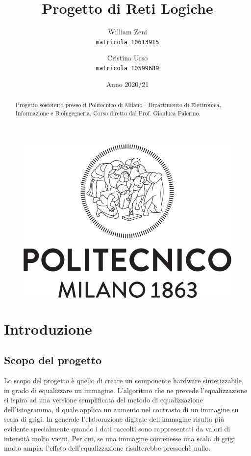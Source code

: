 \documentclass[11pt, a4paper]{article}
\title{Progetto di Reti Logiche}
\author{
  William Zeni\\
  \texttt{matricola 10613915}
  \and
  Cristina Urso\\
  \texttt{matricola 10599689}
}
\date{Anno 2020/21}
\begin{document}
\begin{figure}[t]
  \centering
  \vspace{3cm}
  \includegraphics[scale=0.4]{Logo_Politecnico_Milano.png}
  \vspace{3cm}
\end{figure}

\maketitle
\renewcommand{\abstractname}{ }
\begin{abstract}
  \centering
  Progetto sostenuto presso il Politecnico di Milano - Dipartimento di Elettronica, Informazione e Bioingegneria. Corso diretto dal Prof. Gianluca Palermo.
\end{abstract}

\thispagestyle{empty}
\pagebreak
\tableofcontents
\thispagestyle{empty}
\pagebreak
{}


\section{Introduzione}
\subsection{Scopo del progetto}
Lo scopo del progetto è quello di creare un componente hardware sintetizzabile, in grado di equalizzare un immagine. L'algoritmo che ne prevede l'equalizzazione si ispira ad una versione semplificata del metodo di equalizzazione dell'istogramma, il quale applica un aumento nel contrasto di un immagine su scala di grigi. In generale l'elaborazione digitale dell'immagine risulta più evidente specialmente quando i dati raccolti sono rappresentati da valori di intensità molto vicini. Per cui, se una immagine contenesse una scala di grigi molto ampia, l'effeto dell'equalizzazione risulterebbe pressochè nullo.
\end{document}
